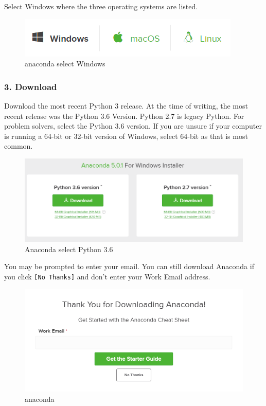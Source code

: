 \documentclass{book}
\makeatletter
\def\maxwidth{\ifdim\Gin@nat@width>\linewidth\linewidth
    \else\Gin@nat@width\fi}
\let\Oldincludegraphics\includegraphics
\renewcommand{\includegraphics}[1]{\Oldincludegraphics[width=.8\maxwidth]{#1}}
\makeatother
\begin{document}
Select Windows where the three operating systems are listed.

\begin{figure}
\centering
\includegraphics{images/anaconda_select_windows.png}
\caption{anaconda select Windows}
\end{figure}
    




    
        \subsubsection{3. Download}\label{download}

Download the most recent Python 3 release. At the time of writing, the
most recent release was the Python 3.6 Version. Python 2.7 is legacy
Python. For problem solvers, select the Python 3.6 version. If you are
unsure if your computer is running a 64-bit or 32-bit version of
Windows, select 64-bit as that is most common.

\begin{figure}
\centering
\includegraphics{images/anaconda_python3_or_python2.png}
\caption{Anaconda select Python 3.6}
\end{figure}

You may be prompted to enter your email. You can still download Anaconda
if you click \lstinline![No Thanks]! and don't enter your Work Email
address.

\begin{figure}
\centering
\includegraphics{images/anaconda_enter_email.png}
\caption{anaconda}
\end{figure}
\end{document}
